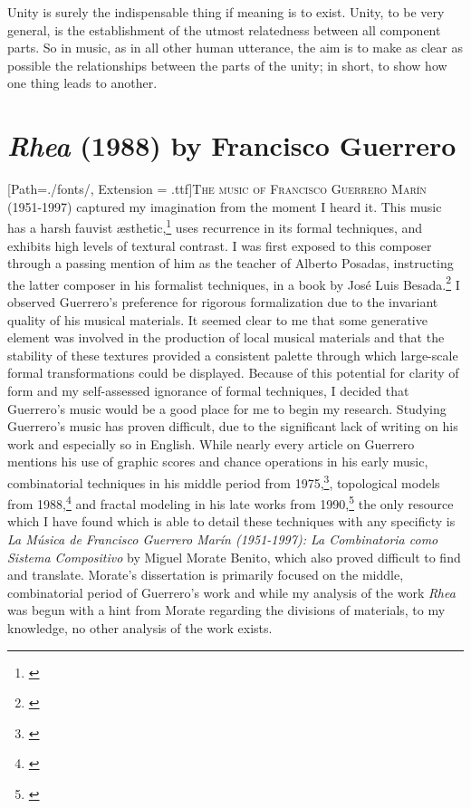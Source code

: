 \begin{savequote}[75mm]
Unity is surely the indispensable thing if meaning is to exist. Unity, to be very general, is the establishment of the utmost relatedness between all component parts. So in music, as in all other human utterance, the aim is to make as clear as possible the relationships between the parts of the unity; in short, to show how one thing leads to another.
\end{savequote}

\chapter{\textit{Rhea} (1988) by Francisco Guerrero}
\label{Chapter1}

\lettrine[lines=3]{\setmainfont{GoudyInitialen}[Path=./fonts/, Extension = .ttf]\color{printGreen}T}{he music of Francisco Guerrero Marín} (1951-1997) captured my imagination from the moment I heard it. This music has a harsh fauvist æsthetic,\footnote{\citet[69]{guerreropaper}} uses recurrence in its formal techniques, and exhibits high levels of textural contrast. I was first exposed to this composer through a passing mention of him as the teacher of Alberto Posadas, instructing the latter composer in his formalist techniques, in a book by José Luis Besada.\footnote{\citet[58]{besada}} I observed Guerrero's preference for rigorous formalization due to the invariant quality of his musical materials. It seemed clear to me that some generative element was involved in the production of local musical materials and that the stability of these textures provided a consistent palette through which large-scale formal transformations could be displayed. Because of this potential for clarity of form and my self-assessed ignorance of formal techniques, I decided that Guerrero's music would be a good place for me to begin my research. Studying Guerrero's music has proven difficult, due to the significant lack of writing on his work and especially so in English. While nearly every article on Guerrero mentions his use of graphic scores and chance operations in his early music, combinatorial techniques in his middle period from 1975,\footnote{\citet[77]{guerreropaper}}, topological models from 1988,\footnote{\citet[77]{guerreropaper}} and fractal modeling in his late works from 1990,\footnote{\citet[77]{guerreropaper}} the only resource which I have found which is able to detail these techniques with any specificty is \textit{La Música de Francisco Guerrero Marín (1951-1997): La Combinatoria como Sistema Compositivo} by Miguel Morate Benito, which also proved difficult to find and translate. Morate's dissertation is primarily focused on the middle, combinatorial period of Guerrero's work and while my analysis of the work \textit{Rhea} was begun with a hint from Morate regarding the divisions of materials, to my knowledge, no other analysis of the work exists.

